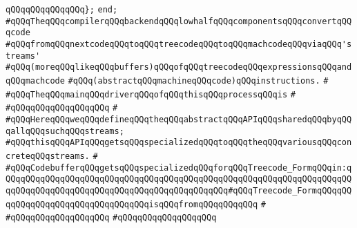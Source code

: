 \newline
\newline
\verb|qQQqqQQqqQQqqQQq};|\newline
\verb|end;|\newline
\newline
\newline
\verb|#qQQqTheqQQqcompilerqQQqbackendqQQqlowhalfqQQqcomponentsqQQqconvertqQQqcode|\newline
\verb|#qQQqfromqQQqnextcodeqQQqtoqQQqtreecodeqQQqtoqQQqmachcodeqQQqviaqQQq'streams'|\newline
\verb|#qQQq(moreqQQqlikeqQQqbuffers)qQQqofqQQqtreecodeqQQqexpressionsqQQqandqQQqmachcode|\newline
\verb|#qQQq(abstractqQQqmachineqQQqcode)qQQqinstructions.|\newline
\verb|#|\newline
\verb|#qQQqTheqQQqmainqQQqdriverqQQqofqQQqthisqQQqprocessqQQqis|\newline
\verb|#|\newline
\verb|#qQQqqQQqqQQqqQQqqQQq|\newline
\verb|#|\newline
\verb|#qQQqHereqQQqweqQQqdefineqQQqtheqQQqabstractqQQqAPIqQQqsharedqQQqbyqQQqallqQQqsuchqQQqstreams;|\newline
\verb|#qQQqthisqQQqAPIqQQqgetsqQQqspecializedqQQqtoqQQqtheqQQqvariousqQQqconcreteqQQqstreams.|\newline
\verb|#|\newline
\verb|#qQQqCodebufferqQQqgetsqQQqspecializedqQQqforqQQqTreecode_FormqQQqin:qQQqqQQqqQQqqQQqqQQqqQQqqQQqqQQqqQQqqQQqqQQqqQQqqQQqqQQqqQQqqQQqqQQqqQQqqQQqqQQqqQQqqQQqqQQqqQQqqQQqqQQqqQQqqQQqqQQq#qQQqTreecode_FormqQQqqQQqqQQqqQQqqQQqqQQqqQQqqQQqqQQqisqQQqfromqQQqqQQqqQQq|\newline
\verb|#|\newline
\verb|#qQQqqQQqqQQqqQQqqQQq|\newline
\verb|#qQQqqQQqqQQqqQQqqQQq|\newline
